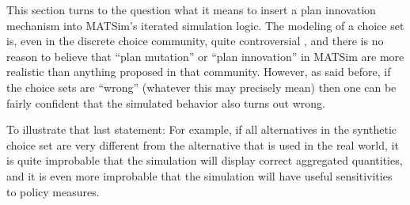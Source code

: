 This section turns to the question what it means to insert a plan
innovation mechanism into MATSim's iterated simulation logic. The
modeling of a choice set is, even in the discrete choice community,
quite controversial \citep{frejinger-2010}, and there is no reason
to believe that {}``plan mutation'' or {}``plan innovation'' in
MATSim are more realistic than anything proposed in that community.
However, as said before, if the choice sets are {}``wrong'' (whatever
this may precisely mean) then one can be fairly confident that the
simulated behavior also turns out wrong.

 To illustrate that last statement:
%
For example, if all alternatives in the synthetic choice set are very different from the alternative that is used in the real world, it is quite improbable that the simulation will display correct aggregated quantities, and it is even more improbable that the simulation will have useful sensitivities to policy measures.




